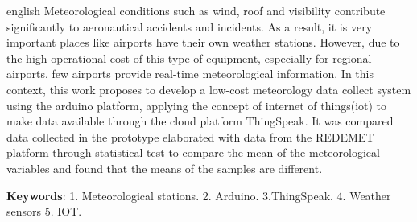 \begin{resumo}[Abstract]
 \begin{otherlanguage*}{english}
   Meteorological conditions such as wind, roof and visibility contribute significantly to aeronautical accidents and incidents. As a result, it is very important places like airports have their own weather stations. However, due to the high operational cost of this type of equipment, especially for regional airports, few airports provide real-time meteorological information. In this context, this work proposes to develop a low-cost meteorology data collect system using the arduino platform, applying the concept of internet of things(iot) to make data available through the cloud platform ThingSpeak. It was compared data collected in the prototype elaborated with data from the REDEMET platform through statistical test to compare the mean of the meteorological variables and found that the means of the samples are different.


   \vspace{\onelineskip}
   \noindent 
   \textbf{Keywords}: 1. Meteorological stations. 2. Arduino. 3.ThingSpeak. 4. Weather sensors 5. IOT.
 \end{otherlanguage*}
\end{resumo}